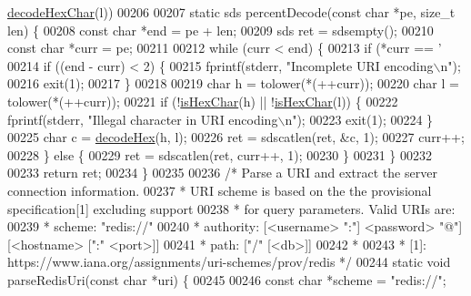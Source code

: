 \begin{DoxyCode}
{{{      \hyperlink{redis-cli_8c_ab610530dccdfe42adbac4677a568645a}{decodeHexChar}\textcolor{preprocessor}{(}\textcolor{preprocessor}{l}\textcolor{preprocessor}{)}\textcolor{preprocessor}{)}
00206 
00207 \textcolor{keyword}{static} sds percentDecode(\textcolor{keyword}{const} \textcolor{keywordtype}{char} *pe, size\_t len) \{
00208     \textcolor{keyword}{const} \textcolor{keywordtype}{char} *end = pe + len;
00209     sds ret = sdsempty();
00210     \textcolor{keyword}{const} \textcolor{keywordtype}{char} *curr = pe;
00211 
00212     \textcolor{keywordflow}{while} (curr < end) \{
00213         \textcolor{keywordflow}{if} (*curr == \textcolor{stringliteral}{'%
00214             \textcolor{keywordflow}{if} ((end - curr) < 2) \{
00215                 fprintf(stderr, \textcolor{stringliteral}{"Incomplete URI encoding\(\backslash\)n"});
00216                 exit(1);
00217             \}
00218 
00219             \textcolor{keywordtype}{char} h = tolower(*(++curr));
00220             \textcolor{keywordtype}{char} l = tolower(*(++curr));
00221             \textcolor{keywordflow}{if} (!\hyperlink{redis-cli_8c_ab2fbc70c2119ce8e23755a86933af1f5}{isHexChar}(h) || !\hyperlink{redis-cli_8c_ab2fbc70c2119ce8e23755a86933af1f5}{isHexChar}(l)) \{
00222                 fprintf(stderr, \textcolor{stringliteral}{"Illegal character in URI encoding\(\backslash\)n"});
00223                 exit(1);
00224             \}
00225             \textcolor{keywordtype}{char} c = \hyperlink{redis-cli_8c_ae03eb95fffcdab7dfa7faeadd04ad9f4}{decodeHex}(h, l);
00226             ret = sdscatlen(ret, &c, 1);
00227             curr++;
00228         \} \textcolor{keywordflow}{else} \{
00229             ret = sdscatlen(ret, curr++, 1);
00230         \}
00231     \}
00232 
00233     \textcolor{keywordflow}{return} ret;
00234 \}
00235 
00236 \textcolor{comment}{/* Parse a URI and extract the server connection information.}
00237 \textcolor{comment}{ * URI scheme is based on the the provisional specification[1] excluding support}
00238 \textcolor{comment}{ * for query parameters. Valid URIs are:}
00239 \textcolor{comment}{ *   scheme:    "redis://"}
00240 \textcolor{comment}{ *   authority: [<username> ":"] <password> "@"] [<hostname> [":" <port>]]}
00241 \textcolor{comment}{ *   path:      ["/" [<db>]]}
00242 \textcolor{comment}{ *}
00243 \textcolor{comment}{ *  [1]: https://www.iana.org/assignments/uri-schemes/prov/redis */}
00244 \textcolor{keyword}{static} \textcolor{keywordtype}{void} parseRedisUri(\textcolor{keyword}{const} \textcolor{keywordtype}{char} *uri) \{
00245 
00246     \textcolor{keyword}{const} \textcolor{keywordtype}{char} *scheme = \textcolor{stringliteral}{"redis://"};
}}}}
\end{DoxyCode}
